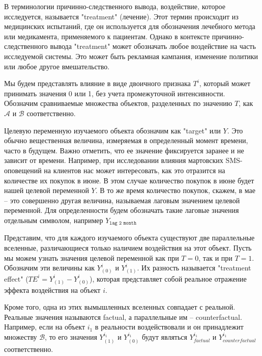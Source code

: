         В терминологии причинно-следственного вывода, воздействие, которое исследуется, называется "treatment" (лечение).
        Этот термин происходит из медицинских испытаний, где он используется для обозначения лечебного метода или медикамента, применяемого к пациентам.
        Однако в контексте причинно-следственного вывода "treatment" может обозначать любое воздействие на часть исследуемой системы.
        Это может быть рекламная кампания, изменение политики или любое другое вмешательство.

        Мы будем представлять влияние в виде двоичного признака $T^i$, который может принимать значения 0 или 1, без учета промежуточной интенсивности.
        Обозначим сравниваемые множества объектов, разделенных по значению $T$, как $\mathcal{A}$ и $\mathcal{B}$ соответственно.

        Целевую переменную изучаемого объекта обозначим как "target" или $Y$.
        Это обычно вещественная величина, измеряемая в определенный момент времени, часто в будущем.
        Важно отметить, что ее значение фиксируется заранее и не зависит от времени.
        Например, при исследовании влияния мартовских SMS-оповещений на клиентов нас может интересовать, как это отразится на количестве их покупок в июне.
        В этом случае количество покупок в июне будет нашей целевой переменной $Y$.
        В то же время количество покупок, скажем, в мае -- это совершенно другая величина, называемая лаговым значением целевой переменной.
        Для определенности будем обозначать такие лаговые значения отдельным символом, например $Y_{\texttt{lag 2 month}}$

        Представим, что для каждого изучаемого объекта существуют две параллельные вселенные, различающиеся только наличием воздействия на этот объект.
        Пусть мы можем узнать значения целевой переменной как при $T=0$, так и при $T=1$.
        Обозначим эти величины как $Y^i_{(0)}$ и $Y^i_{(1)}$.
        Их разность называется "treatment effect" ($TE^i = Y^i_{(1)} - Y^i_{(0)}$), которая представляет собой реальное отражение эффекта воздействия на объект $i$.

        Кроме того, одна из этих вымышленных вселенных совпадает с реальной.
        Реальные значения называются factual, а параллельные им -- counterfactual.
        Например, если на объект $i_1$ в реальности воздействовали и он принадлежит множеству $\mathcal{B}$, то его значения $Y^{i_1}_{(1)}$ и $Y^{i_1}_{(0)}$ будут являться $Y^{i_1}_{factual}$ и $Y^{i_1}_{counterfactual}$ соответственно.

